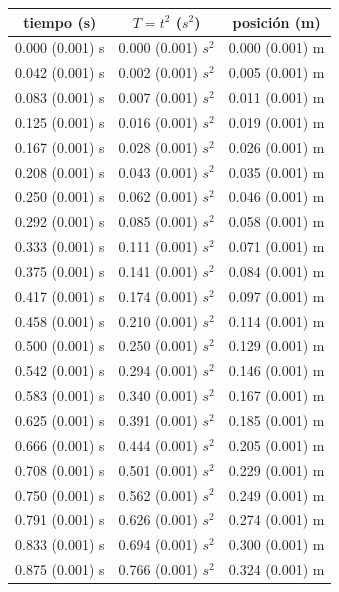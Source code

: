 \documentclass[12pt,a4paper]{article}
\begin{document}
\begin{table}[h!]
\begin{center}
\begin{tabular}{|c|c|c|}
\hline
tiempo (s) & $T = t^2$ ($s^2$) & posición (m) \\ \hline
0.000 (0.001) s & 0.000 (0.001) $s^2$ & 0.000 (0.001) m \\ \hline
0.042 (0.001) s & 0.002 (0.001) $s^2$ & 0.005 (0.001) m \\ \hline
0.083 (0.001) s & 0.007 (0.001) $s^2$ & 0.011 (0.001) m \\ \hline
0.125 (0.001) s & 0.016 (0.001) $s^2$ & 0.019 (0.001) m \\ \hline
0.167 (0.001) s & 0.028 (0.001) $s^2$ & 0.026 (0.001) m \\ \hline
0.208 (0.001) s & 0.043 (0.001) $s^2$ & 0.035 (0.001) m \\ \hline
0.250 (0.001) s & 0.062 (0.001) $s^2$ & 0.046 (0.001) m \\ \hline
0.292 (0.001) s & 0.085 (0.001) $s^2$ & 0.058 (0.001) m \\ \hline
0.333 (0.001) s & 0.111 (0.001) $s^2$ & 0.071 (0.001) m \\ \hline
0.375 (0.001) s & 0.141 (0.001) $s^2$ & 0.084 (0.001) m \\ \hline
0.417 (0.001) s & 0.174 (0.001) $s^2$ & 0.097 (0.001) m \\ \hline
0.458 (0.001) s & 0.210 (0.001) $s^2$ & 0.114 (0.001) m \\ \hline
0.500 (0.001) s & 0.250 (0.001) $s^2$ & 0.129 (0.001) m \\ \hline
0.542 (0.001) s & 0.294 (0.001) $s^2$ & 0.146 (0.001) m \\ \hline
0.583 (0.001) s & 0.340 (0.001) $s^2$ & 0.167 (0.001) m \\ \hline
0.625 (0.001) s & 0.391 (0.001) $s^2$ & 0.185 (0.001) m \\ \hline
0.666 (0.001) s & 0.444 (0.001) $s^2$ & 0.205 (0.001) m \\ \hline
0.708 (0.001) s & 0.501 (0.001) $s^2$ & 0.229 (0.001) m \\ \hline
0.750 (0.001) s & 0.562 (0.001) $s^2$ & 0.249 (0.001) m \\ \hline
0.791 (0.001) s & 0.626 (0.001) $s^2$ & 0.274 (0.001) m \\ \hline
0.833 (0.001) s & 0.694 (0.001) $s^2$ & 0.300 (0.001) m \\ \hline
0.875 (0.001) s & 0.766 (0.001) $s^2$ & 0.324 (0.001) m \\ \hline

\end{tabular}
\end{center}
\end{table}
\end{document}
